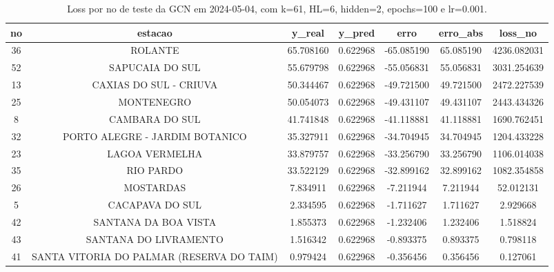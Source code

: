 \begin{table}[h]
\centering
\caption{Loss por no de teste da GCN em 2024-05-04, com k=61, HL=6, hidden=2, epochs=100 e lr=0.001.}
\label{tab:gcn_loss_k61_hl6_h2_e100_d20240504}
\begin{tabular}{ccccccc}
\toprule
no & estacao & y\_real & y\_pred & erro & erro\_abs & loss\_no \\
\midrule
36 & ROLANTE & 65.708160 & 0.622968 & -65.085190 & 65.085190 & 4236.082031 \\
52 & SAPUCAIA DO SUL & 55.679798 & 0.622968 & -55.056831 & 55.056831 & 3031.254639 \\
13 & CAXIAS DO SUL - CRIUVA & 50.344467 & 0.622968 & -49.721500 & 49.721500 & 2472.227539 \\
25 & MONTENEGRO & 50.054073 & 0.622968 & -49.431107 & 49.431107 & 2443.434326 \\
8 & CAMBARA DO SUL & 41.741848 & 0.622968 & -41.118881 & 41.118881 & 1690.762451 \\
32 & PORTO ALEGRE - JARDIM BOTANICO & 35.327911 & 0.622968 & -34.704945 & 34.704945 & 1204.433228 \\
23 & LAGOA VERMELHA & 33.879757 & 0.622968 & -33.256790 & 33.256790 & 1106.014038 \\
35 & RIO PARDO & 33.522129 & 0.622968 & -32.899162 & 32.899162 & 1082.354858 \\
26 & MOSTARDAS & 7.834911 & 0.622968 & -7.211944 & 7.211944 & 52.012131 \\
5 & CACAPAVA DO SUL & 2.334595 & 0.622968 & -1.711627 & 1.711627 & 2.929668 \\
42 & SANTANA DA BOA VISTA & 1.855373 & 0.622968 & -1.232406 & 1.232406 & 1.518824 \\
43 & SANTANA DO LIVRAMENTO & 1.516342 & 0.622968 & -0.893375 & 0.893375 & 0.798118 \\
41 & SANTA VITORIA DO PALMAR (RESERVA DO TAIM) & 0.979424 & 0.622968 & -0.356456 & 0.356456 & 0.127061 \\
\bottomrule
\end{tabular}
\end{table}
